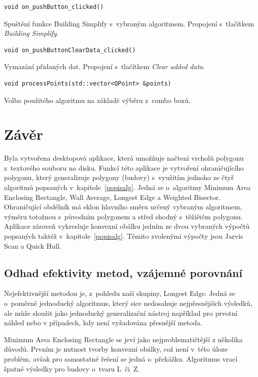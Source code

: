 \documentclass[a4paper, 12pt, oneside, titlepage]{article} %
\begin{document}
\begin{verbatim}
void on_pushButton_clicked()
\end{verbatim}
Spuštění funkce Building Simplify s~vybraným algoritmem. Propojení s~tlačítkem \emph{Building Simplify}.\\

\begin{verbatim}
void on_pushButtonClearData_clicked()
\end{verbatim}
Vymazání přidaných dat. Propojení s~tlačítkem \emph{Clear added data}.\\

\begin{verbatim}
void processPoints(std::vector<QPoint> &points)
\end{verbatim}
Volba použitého algoritmu na základě výběru z~combo boxů.\\



\section{Závěr}
Byla vytvořena desktopová aplikace, která umožňuje načtení vrcholů polygonu z~textového souboru na disku. Funkcí této aplikace je vytvoření ohraničujícího polygonu, který generalizuje polygony (budovy) s~využitím jednoho ze čtyř algoritmů popsaných v~kapitole~\ref{popisalg}. Jedná se o~algoritmy Minimum Area Enclosing Rectangle, Wall Average, Longest Edge a Weighted Bisector. Ohraničující obdélník má sklon hlavního směru určený vybraným algoritmem, výměru totožnou s~původním polygonem a střed shodný s~těžištěm polygonu. Aplikace zároveň vykresluje konvexní obálku jedním ze dvou vybraných výpočtů popsaných taktéž v~kapitole~\ref{popisalg}. Těmito zvolenými výpočty jsou Jarvis Scan a Quick Hull.

\subsection{Odhad efektivity metod, vzájemné porovnání}
Nejefektivnější metodou je, z~pohledu naší skupiny, Longest Edge. Jedná se o~poměrně jednoduchý algoritmus, který sice nedosahuje nejpřesnějších výsledků, ale může sloužit jako jednoduchý generalizační nástroj například pro prvotní náhled nebo v případech, kdy není vyžadována přesnější metoda. 

Minimum Area Enclosing Rectangle se jeví jako nejproblematičtější z několika důvodů. Prvním je nutnost tvorby konvexní obálky, což není v~této úloze problém, avšak pro samostatné řešení se jedná o~překážku. Algoritmus vrací špatné výsledky pro budovy o~tvaru L~či~Z.
\end{document}
